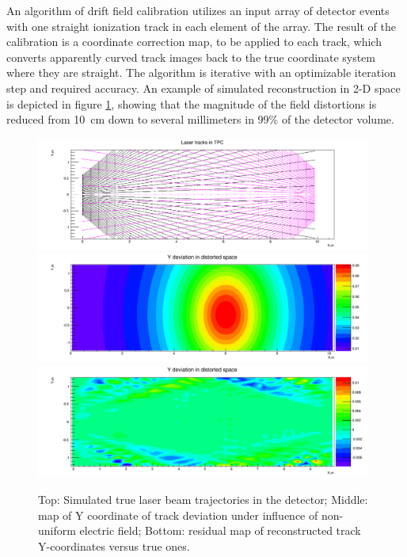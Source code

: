 An algorithm of drift field calibration utilizes an input array of detector events with one straight ionization track in each element of the array. The result of the calibration is a coordinate correction map, to be applied to each track, which converts apparently curved track images back to the true coordinate system where they are straight. The algorithm is iterative with an optimizable iteration step and required accuracy. An example of simulated reconstruction in 2-D space is depicted in figure \ref{Reco}, showing that the magnitude of the field distortions is reduced from 10~cm down to several millimeters in 99\% of the detector volume.


\begin{figure}[htb]
\centering	
\includegraphics[width=0.98\textwidth]{figures/Original_Tracks.pdf}
\includegraphics[width=0.98\textwidth]{figures/Ydev.pdf}
\includegraphics[width=0.98\textwidth]{figures/Yresidual.pdf}
\caption{Top: Simulated true laser beam trajectories in the detector; Middle: map of Y coordinate of track deviation under influence of non-uniform electric field; Bottom: residual map of reconstructed track Y-coordinates versus true ones.} 
\label{Reco}
\end{figure}


